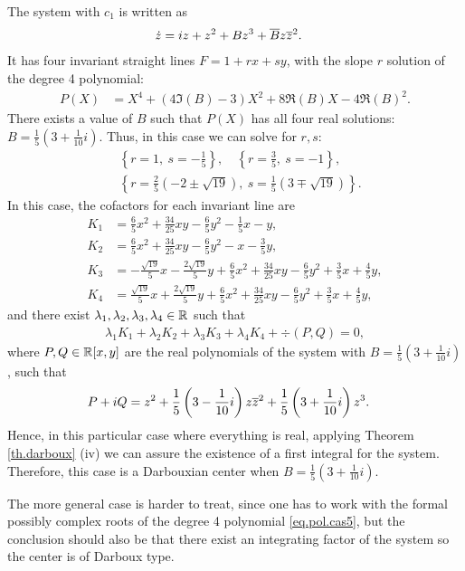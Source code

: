The system with $c_1$ is written as
\begin{align}
\dot z &= iz+z^2+Bz^3+\overline B z\overline{z}^2.
\end{align}
It has four invariant straight lines $F=1+rx+sy$, with the slope $r$ solution of the degree 4 polynomial:
\begin{align}
P(X)&=X^4+(4\Im(B)-3)X^2+8\Re(B)X-4\Re(B)^2.
\label{eq.pol.cas5}
\end{align}
There exists a value of $B$ such that $P(X)$ has all four real solutions: $B=\frac{1}{5}(3+\frac{1}{10}i)$. Thus, in this case we can solve for $r,s$:
\begin{align*}
&{}\left\{r=1,~s=-\frac{1}{5}\right\},\quad\left\{r=\frac{3}{5},~s=-1\right\},\\
&{}\left\{r=\frac{2}{5}(-2\pm\sqrt{19}),~s=\frac{1}{5}(3\mp\sqrt{19})\right\}.
\end{align*}
In this case, the cofactors for each invariant line are
\begin{align*}
K_1&=\frac{6}{5}x^2+\frac{34}{25}xy-\frac{6}{5}y^2-\frac{1}{5}x-y,\\
K_2&=\frac{6}{5}x^2+\frac{34}{25}xy-\frac{6}{5}y^2-x-\frac{3}{5}y,\\
K_3&=-\frac{\sqrt{19}}{5}x-\frac{2\sqrt{19}}{5}y+\frac{6}{5}x^2+\frac{34}{25}xy-\frac{6}{5}y^2+\frac{3}{5}x+\frac{4}{5}y,\\
K_4&=\frac{\sqrt{19}}{5}x+\frac{2\sqrt{19}}{5}y+\frac{6}{5}x^2+\frac{34}{25}xy-\frac{6}{5}y^2+\frac{3}{5}x+\frac{4}{5}y,
\end{align*}
and there exist $\lambda_1,\lambda_2,\lambda_3,\lambda_4\in\mathbb{R}$ such that
\begin{align*}
\lambda_1K_1+\lambda_2K_2+\lambda_3K_3+\lambda_4K_4+\div(P,Q)=0,
\end{align*}
where $P,Q\in\mathbb{R}[x,y]$ are the real polynomials of the system with $B=\frac{1}{5}(3+\frac{1}{10}i)$, such that
\begin{align*}
P+iQ&=z^2+\frac{1}{5}\left(3-\frac{1}{10}i\right)z\overline{z}^2+\frac{1}{5}\left(3+\frac{1}{10}i\right)z^3.
\end{align*}
Hence, in this particular case where everything is real, applying Theorem \ref{th.darboux} (iv) we can assure the existence of a first integral for the system. Therefore, this case is a Darbouxian center when $B=\frac{1}{5}(3+\frac{1}{10}i)$.

The more general case is harder to treat, since one has to work with the formal possibly complex roots of the degree 4 polynomial \eqref{eq.pol.cas5}, but the conclusion should also be that there exist an integrating factor of the system so the center is of Darboux type.


